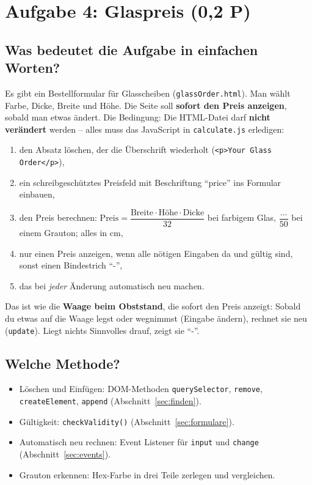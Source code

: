 \documentclass[a4paper,11pt]{article}
\begin{document}
\section{Aufgabe 4: Glaspreis (0,2 P)}\label{sec:a4}

\subsection{Was bedeutet die Aufgabe in einfachen Worten?}

Es gibt ein Bestellformular für Glasscheiben (\texttt{glassOrder.html}). Man wählt Farbe, Dicke, Breite und Höhe.
Die Seite soll \textbf{sofort den Preis anzeigen}, sobald man etwas ändert. Die Bedingung: Die HTML-Datei darf
\textbf{nicht verändert} werden -- alles muss das JavaScript in \texttt{calculate.js} erledigen:
\begin{enumerate}[nosep]
\item den Absatz löschen, der die Überschrift wiederholt (\texttt{<p>Your Glass Order</p>}),
\item ein schreibgeschütztes Preisfeld mit Beschriftung "`price"' ins Formular einbauen,
\item den Preis berechnen: $\text{Preis} = \dfrac{\text{Breite} \cdot \text{Höhe} \cdot \text{Dicke}}{32}$ bei farbigem
      Glas, $\dfrac{\dots}{50}$ bei einem Grauton; alles in cm,
\item nur einen Preis anzeigen, wenn alle nötigen Eingaben da und gültig sind, sonst einen Bindestrich "`-"',
\item das bei \emph{jeder} Änderung automatisch neu machen.
\end{enumerate}

\begin{analogie}
Das ist wie die \textbf{Waage beim Obststand}, die sofort den Preis anzeigt: Sobald du etwas auf die Waage legst oder
wegnimmst (Eingabe ändern), rechnet sie neu (\texttt{update}). Liegt nichts Sinnvolles drauf, zeigt sie "`-"'.
\end{analogie}

\subsection{Welche Methode?}
\begin{itemize}[nosep]
\item Löschen und Einfügen: DOM-Methoden \texttt{querySelector}, \texttt{remove}, \texttt{createElement},
      \texttt{append} (Abschnitt~\ref{sec:finden}).
\item Gültigkeit: \texttt{checkValidity()} (Abschnitt~\ref{sec:formulare}).
\item Automatisch neu rechnen: Event Listener für \texttt{input} und \texttt{change} (Abschnitt~\ref{sec:events}).
\item Grauton erkennen: Hex-Farbe in drei Teile zerlegen und vergleichen.
\end{itemize}
\end{document}
